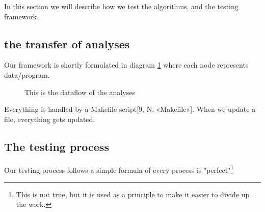 
In this section we will describe how we test the algorithms, and the testing framework.
\subsection{the transfer of analyses}

Our framework is shortly formulated in diagram \ref{fig:flowdiagram} where each node represents data/program.

\begin{figure}[t]
\center
\label{fig:flowdiagram}
\caption{This is the dataflow of the analyses}
\end{figure}

Everything is handled by a Makefile script[9, N. «Makefile»]. When we update a file, everything gets updated.
\subsection{The testing process}
Our testing process follows a simple formula of every process is "perfect"\footnote{This is not true, but it is used as a principle to make it easier to divide up the work.}
